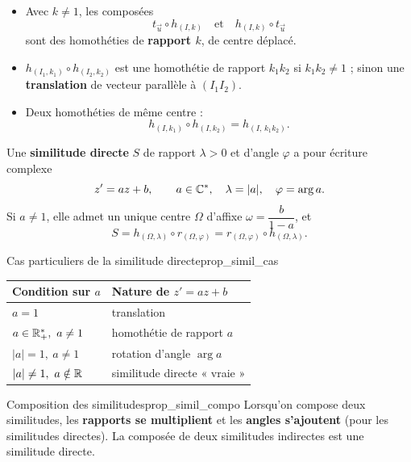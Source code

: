 \begin{theoreme}
	\begin{itemize}[label=\textbullet]
		\item Avec $k\neq 1$, les composées
		$$t_{\vec u}\circ h_{(I,k)} \quad\text{et}\quad h_{(I,k)}\circ t_{\vec u}$$
		sont des homothéties de \textbf{rapport $k$}, de centre déplacé.
		\item $h_{(I_1,k_1)}\circ h_{(I_2,k_2)}$ est une homothétie de rapport
		$k_1k_2$ si $k_1k_2\neq 1$ ; sinon une \textbf{translation} de vecteur
		parallèle à $(I_1I_2)$.
		\item Deux homothéties de même centre :
		$$h_{(I,k_1)}\circ h_{(I,k_2)} = h_{(I,\,k_1k_2)}.$$
	\end{itemize}
\end{theoreme}

\begin{definition}
	Une \textbf{similitude directe} $S$ de rapport $\lambda>0$ et d'angle
	$\varphi$ a pour écriture complexe
	$$
	z' = az + b,\qquad a\in\mathbb{C}^*,\quad \lambda=|a|,\quad \varphi=\arg a.
	$$
	Si $a\neq 1$, elle admet un unique centre $\Omega$ d'affixe
	$\omega=\dfrac{b}{1-a}$, et
	$$
	S = h_{(\Omega,\lambda)}\circ r_{(\Omega,\varphi)}
	  = r_{(\Omega,\varphi)}\circ h_{(\Omega,\lambda)}.
	$$
\end{definition}

\begin{propriete}{Cas particuliers de la similitude directe}{prop_simil_cas}
	\begin{center}
	\renewcommand{\arraystretch}{1.3}
	\begin{tabular}{>{\raggedright\arraybackslash}p{3.4cm}
	                >{\raggedright\arraybackslash}p{4.6cm}}
	\hline
	\textbf{Condition sur $a$} & \textbf{Nature de $z'=az+b$} \\
	\hline
	$a=1$ & translation \\
	$a\in\R_+^*,\ a\neq 1$ & homothétie de rapport $a$ \\
	$|a|=1,\ a\neq 1$ & rotation d'angle $\arg a$ \\
	$|a|\neq 1,\ a\notin\R$ & similitude directe « vraie » \\
	\hline
	\end{tabular}
	\end{center}
\end{propriete}

\begin{propriete}{Composition des similitudes}{prop_simil_compo}
	Lorsqu'on compose deux similitudes, les \textbf{rapports se multiplient} et
	les \textbf{angles s'ajoutent} (pour les similitudes directes). La composée
	de deux similitudes indirectes est une similitude directe.
\end{propriete}

